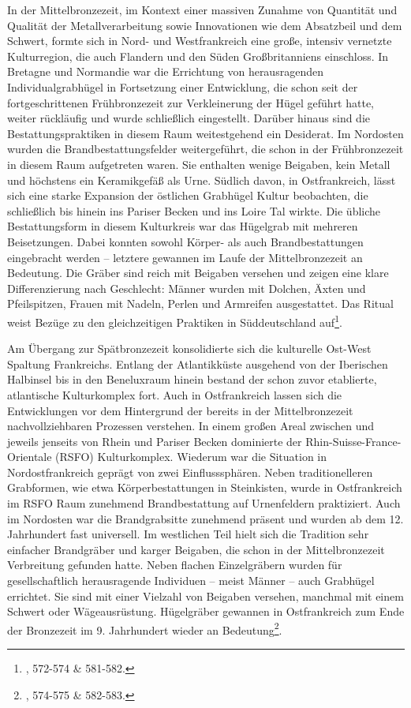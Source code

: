 \documentclass[openany,twoside,twocolumn]{book}
\let\rmarkdownfootnote\footnote%
\def\footnote{\protect\rmarkdownfootnote}
\begin{document}
In der Mittelbronzezeit, im Kontext einer massiven Zunahme von Quantität und Qualität der Metallverarbeitung sowie Innovationen wie dem Absatzbeil und dem Schwert, formte sich in Nord- und Westfrankreich eine große, intensiv vernetzte Kulturregion, die auch Flandern und den Süden Großbritanniens einschloss. In Bretagne und Normandie war die Errichtung von herausragenden Individualgrabhügel in Fortsetzung einer Entwicklung, die schon seit der fortgeschrittenen Frühbronzezeit zur Verkleinerung der Hügel geführt hatte, weiter rückläufig und wurde schließlich eingestellt. Darüber hinaus sind die Bestattungspraktiken in diesem Raum weitestgehend ein Desiderat. Im Nordosten wurden die Brandbestattungsfelder weitergeführt, die schon in der Frühbronzezeit in diesem Raum aufgetreten waren. Sie enthalten wenige Beigaben, kein Metall und höchstens ein Keramikgefäß als Urne. Südlich davon, in Ostfrankreich, lässt sich eine starke Expansion der östlichen Grabhügel Kultur beobachten, die schließlich bis hinein ins Pariser Becken und ins Loire Tal wirkte. Die übliche Bestattungsform in diesem Kulturkreis war das Hügelgrab mit mehreren Beisetzungen. Dabei konnten sowohl Körper- als auch Brandbestattungen eingebracht werden -- letztere gewannen im Laufe der Mittelbronzezeit an Bedeutung. Die Gräber sind reich mit Beigaben versehen und zeigen eine klare Differenzierung nach Geschlecht: Männer wurden mit Dolchen, Äxten und Pfeilspitzen, Frauen mit Nadeln, Perlen und Armreifen ausgestattet. Das Ritual weist Bezüge zu den gleichzeitigen Praktiken in Süddeutschland auf\footnote{\textcite{mordant_bronze_2013}, 572-574 \& 581-582.}.

Am Übergang zur Spätbronzezeit konsolidierte sich die kulturelle Ost-West Spaltung Frankreichs. Entlang der Atlantikküste ausgehend von der Iberischen Halbinsel bis in den Beneluxraum hinein bestand der schon zuvor etablierte, atlantische Kulturkomplex fort. Auch in Ostfrankreich lassen sich die Entwicklungen vor dem Hintergrund der bereits in der Mittelbronzezeit nachvollziehbaren Prozessen verstehen. In einem großen Areal zwischen und jeweils jenseits von Rhein und Pariser Becken dominierte der Rhin-Suisse-France-Orientale (RSFO) Kulturkomplex. Wiederum war die Situation in Nordostfrankreich geprägt von zwei Einflusssphären. Neben traditionelleren Grabformen, wie etwa Körperbestattungen in Steinkisten, wurde in Ostfrankreich im RSFO Raum zunehmend Brandbestattung auf Urnenfeldern praktiziert. Auch im Nordosten war die Brandgrabsitte zunehmend präsent und wurden ab dem 12. Jahrhundert fast universell. Im westlichen Teil hielt sich die Tradition sehr einfacher Brandgräber und karger Beigaben, die schon in der Mittelbronzezeit Verbreitung gefunden hatte. Neben flachen Einzelgräbern wurden für gesellschaftlich herausragende Individuen -- meist Männer -- auch Grabhügel errichtet. Sie sind mit einer Vielzahl von Beigaben versehen, manchmal mit einem Schwert oder Wägeausrüstung. Hügelgräber gewannen in Ostfrankreich zum Ende der Bronzezeit im 9. Jahrhundert wieder an Bedeutung\footnote{\textcite{mordant_bronze_2013}, 574-575 \& 582-583.}.
\end{document}
